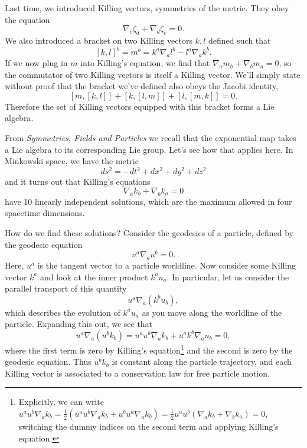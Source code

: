 Last time, we introduced Killing vectors, symmetries of the metric. They obey the equation
$$\nabla_c \zeta_d +\nabla_d \zeta_c=0.$$
We also introduced a bracket on two Killing vectors $k,l$ defined such that
$$[k,l]^b=m^b=k^a \nabla_a l^b-l^a\nabla_a k^b.$$ If we now plug in $m$ into Killing's equation, we find that 
$\nabla_a m_b + \nabla_b m_a=0$, so the commutator of two Killing vectors is itself a Killing vector. We'll simply state without proof that the bracket we've defined also obeys the Jacobi identity,
$$[m,[k,l]]+[k,[l,m]]+[l,[m,k]]=0.$$
Therefore the set of Killing vectors equipped with this bracket forms a Lie algebra.

From \textit{Symmetries, Fields and Particles} we recall that the exponential map takes a Lie algebra to its corresponding Lie group. Let's see how that applies here. In Minkowski space, we have the metric
$$ds^2=-dt^2+dx^2+dy^2+dz^2$$
and it turns out that Killing's equations
$$\nabla_a k_b +\nabla_b k_a=0$$
have 10 linearly independent solutions, which are the maximum allowed in four spacetime dimensions.

How do we find these solutions? Consider the geodesics of a particle, defined by the geodesic equation
$$u^a \nabla_a u^b =0.$$
Here, $u^a$ is the tangent vector to a particle worldline. Now consider some Killing vector $k^a$ and look at the inner product $k^a u_a$. In particular, let us consider the parallel transport of this quantity
$$u^a \nabla_a(k^b u_b),$$
which describes the evolution of $k^a u_a$ as you move along the worldline of the particle.
Expanding this out, we see that
$$u^a\nabla_a (u^bk_b)=u^a u^b \nabla_a k_b + u^a k^b \nabla_a u_b=0,$$
where the first term is zero by Killing's equation\footnote{Explicitly, we can write $u^a u^b \nabla_a k_b = \frac{1}{2}(u^a u^b \nabla_a k_b + u^b u^a \nabla_a k_b)=\frac{1}{2}u^a u^b (\nabla_a k_b+ \nabla_b k_a)=0$, switching the dummy indices on the second term and applying Killing's equation.} and the second is zero by the geodesic equation. Thus $u^b k_b$ is constant along the particle trajectory, and each Killing vector is associated to a conservation law for free particle motion.

